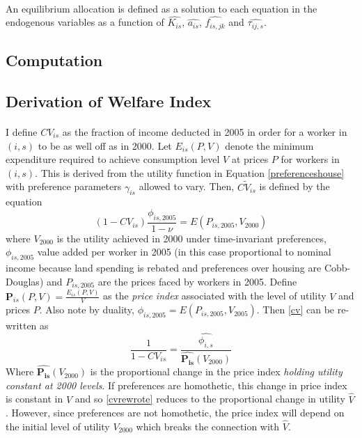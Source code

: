 \documentclass[]{article}
\theoremstyle{plain}
\begin{document}
\paragraph*{}
An equilibrium allocation is defined as a solution to each equation in the endogenous variables as a function of $\hat{K_{is}}$, $\hat{a_{is}}$, $\hat{f_{is,jk}}$ and $\hat{\tau_{ij, s}}$.


\subsection*{Computation}

\subsection*{Derivation of Welfare Index}
\paragraph*{}
I define $CV_{is}$ as the fraction of income deducted in 2005 in order for a worker in $(i,s)$ to be as well off as in 2000. Let $E_{is}(P, V)$ denote the minimum expenditure required to achieve consumption level $V$ at prices $P$ for workers in $(i, s)$. This is derived from the utility function in Equation \eqref{preferenceshouse} with preference parameters $\gamma_{is}$ allowed to vary. Then, $\tilde{CV_{is}}$ is defined by the equation
\begin{equation}\label{cv}
	(1-CV_{is})\frac{\phi_{is, 2005}}{1-\nu} = E(P_{is, 2005}, V_{2000})
\end{equation}
where $V_{2000}$ is the utility achieved in 2000 under time-invariant preferences, $\phi_{is, 2005}$ value added per worker in 2005 (in this case proportional to nominal income because land spending is rebated and preferences over housing are Cobb-Douglas) and $P_{is, 2005}$ are the prices faced by workers in 2005. Define $\mathbf{P}_{is}(P, V) = \frac{E_{is}(P, V)}{V}$ as the \textit{price index} associated with the level of utility $V$ and prices $P$. Also note by duality, $\phi_{is, 2005} = E(P_{is, 2005}, V_{2005})$. Then \eqref{cv} can be re-written as
\begin{equation}\label{cvrewrote}
		\frac{1}{1-CV_{is}} = \frac{\hat{\phi_{i, s}}}{\hat{\mathbf{P_{is}}}(V_{2000})}
\end{equation}
Where $\hat{\mathbf{P_{is}}}(V_{2000})$ is the proportional change in the price index \textit{holding utility constant at 2000 levels}. If preferences are homothetic, this change in price index is constant in $V$ and so \eqref{cvrewrote} reduces to the proportional change in utility $\hat{V}$ \citep{samswamy}. However, since preferences are not homothetic, the price index will depend on the initial level of utility $V_{2000}$ which breaks the connection with $\hat{V}$. 
\end{document}
